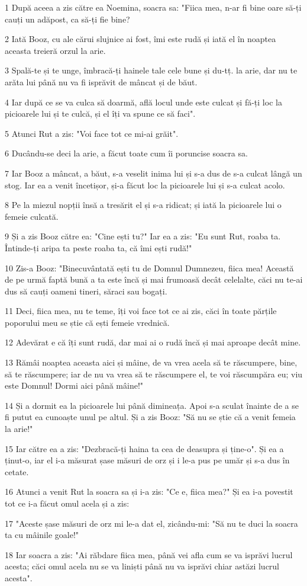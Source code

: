 \par 1 După aceea a zis către ea Noemina, soacra sa: "Fiica mea, n-ar fi bine oare să-ți cauți un adăpost, ca să-ți fie bine?
\par 2 Iată Booz, cu ale cărui slujnice ai fost, îmi este rudă și iată el în noaptea aceasta treieră orzul la arie.
\par 3 Spală-te și te unge, îmbracă-ți hainele tale cele bune și du-tț. la arie, dar nu te arăta lui până nu va fi isprăvit de mâncat și de băut.
\par 4 Iar după ce se va culca să doarmă, află locul unde este culcat și fă-ți loc la picioarele lui și te culcă, și el îți va spune ce să faci".
\par 5 Atunci Rut a zis: "Voi face tot ce mi-ai grăit".
\par 6 Ducându-se deci la arie, a făcut toate cum îi poruncise soacra sa.
\par 7 Iar Booz a mâncat, a băut, s-a veselit inima lui și s-a dus de s-a culcat lângă un stog. Iar ea a venit încetișor, și-a făcut loc la picioarele lui și s-a culcat acolo.
\par 8 Pe la miezul nopții însă a tresărit el și s-a ridicat; și iată la picioarele lui o femeie culcată.
\par 9 Și a zis Booz către ea: "Cine ești tu?" Iar ea a zis: "Eu sunt Rut, roaba ta. Întinde-ți aripa ta peste roaba ta, că îmi ești rudă!"
\par 10 Zis-a Booz: "Binecuvântată ești tu de Domnul Dumnezeu, fiica mea! Această de pe urmă faptă bună a ta este încă și mai frumoasă decât celelalte, căci nu te-ai dus să cauți oameni tineri, săraci sau bogați.
\par 11 Deci, fiica mea, nu te teme, îți voi face tot ce ai zis, căci în toate părțile poporului meu se știe că ești femeie vrednică.
\par 12 Adevărat e că îți sunt rudă, dar mai ai o rudă încă și mai aproape decât mine.
\par 13 Rămâi noaptea aceasta aici și mâine, de va vrea acela să te răscumpere, bine, să te răscumpere; iar de nu va vrea să te răscumpere el, te voi răscumpăra eu; viu este Domnul! Dormi aici până mâine!"
\par 14 Și a dormit ea la picioarele lui până dimineața. Apoi s-a sculat înainte de a se fi putut ea cunoaște unul pe altul. Și a zis Booz: "Să nu se știe că a venit femeia la arie!"
\par 15 Iar către ea a zis: "Dezbracă-ți haina ta cea de deasupra și ține-o". Și ea a ținut-o, iar el i-a măsurat șase măsuri de orz și i le-a pus pe umăr și s-a dus în cetate.
\par 16 Atunci a venit Rut la soacra sa și i-a zis: "Ce e, fiica mea?" Și ea i-a povestit tot ce i-a făcut omul acela și a zis:
\par 17 "Aceste șase măsuri de orz mi le-a dat el, zicându-mi: "Să nu te duci la soacra ta cu mâinile goale!"
\par 18 Iar soacra a zis: "Ai răbdare fiica mea, până vei afla cum se va isprăvi lucrul acesta; căci omul acela nu se va liniști până nu va isprăvi chiar astăzi lucrul acesta".

